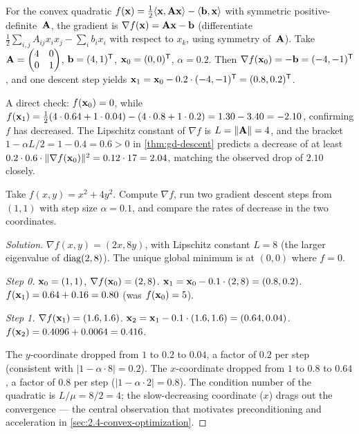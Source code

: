 \begin{example}
\label{ex:gd-step}
For the convex quadratic $f(\mathbf{x}) = \tfrac{1}{2} \langle \mathbf{x}, \mathbf{A} \mathbf{x} \rangle - \langle \mathbf{b}, \mathbf{x} \rangle$
with symmetric positive-definite~$\mathbf{A}$, the gradient is
$\nabla f(\mathbf{x}) = \mathbf{A}\mathbf{x} - \mathbf{b}$ (differentiate
$\tfrac12 \sum_{i,j} A_{ij} x_i x_j - \sum_i b_i x_i$ with respect to
$x_k$, using symmetry of~$\mathbf{A}$). Take
$\mathbf{A} = \begin{pmatrix} 4 & 0 \\ 0 & 1 \end{pmatrix}$,
$\mathbf{b} = (4, 1)^{\mathsf{T}}$, $\mathbf{x}_0 = (0, 0)^{\mathsf{T}}$, $\alpha = 0.2$. Then
$\nabla f(\mathbf{x}_0) = -\mathbf{b} = (-4, -1)^{\mathsf{T}}$, and one descent step
yields $\mathbf{x}_1 = \mathbf{x}_0 - 0.2 \cdot (-4, -1)^{\mathsf{T}} = (0.8, 0.2)^{\mathsf{T}}$.

A direct check: $f(\mathbf{x}_0) = 0$, while
$f(\mathbf{x}_1) = \tfrac{1}{2}(4 \cdot 0.64 + 1 \cdot 0.04) - (4 \cdot 0.8 + 1 \cdot 0.2) = 1.30 - 3.40 = -2.10$,
confirming $f$ has decreased. The Lipschitz constant of $\nabla f$ is
$L = \|\mathbf{A}\| = 4$, and the bracket
$1 - \alpha L / 2 = 1 - 0.4 = 0.6 > 0$ in
\cref{thm:gd-descent} predicts a decrease of at least
$0.2 \cdot 0.6 \cdot \|\nabla f(\mathbf{x}_0)\|^2 = 0.12 \cdot 17 = 2.04$,
matching the observed drop of $2.10$ closely.
\end{example}

\begin{problem}
\label{prob:gd-anisotropic}
Take $f(x, y) = x^2 + 4 y^2$. Compute $\nabla f$, run two gradient
descent steps from $(1, 1)$ with step size $\alpha = 0.1$, and compare
the rates of decrease in the two coordinates.
\end{problem}

\begin{proof}[Solution]
$\nabla f(x, y) = (2x, 8y)$, with Lipschitz constant
$L = 8$ (the larger eigenvalue of $\operatorname{diag}(2, 8)$). The unique global
minimum is at $(0, 0)$ where $f = 0$.

\emph{Step 0.} $\mathbf{x}_0 = (1, 1)$, $\nabla f(\mathbf{x}_0) = (2, 8)$.
$\mathbf{x}_1 = \mathbf{x}_0 - 0.1 \cdot (2, 8) = (0.8, 0.2)$.
$f(\mathbf{x}_1) = 0.64 + 0.16 = 0.80$ (was $f(\mathbf{x}_0) = 5$).

\emph{Step 1.} $\nabla f(\mathbf{x}_1) = (1.6, 1.6)$.
$\mathbf{x}_2 = \mathbf{x}_1 - 0.1 \cdot (1.6, 1.6) = (0.64, 0.04)$.
$f(\mathbf{x}_2) = 0.4096 + 0.0064 = 0.416$.

The $y$-coordinate dropped from $1$ to $0.2$ to $0.04$, a factor of
$0.2$ per step (consistent with $|1 - \alpha \cdot 8| = 0.2$). The
$x$-coordinate dropped from $1$ to $0.8$ to $0.64$, a factor of $0.8$
per step ($|1 - \alpha \cdot 2| = 0.8$). The condition number of the
quadratic is $L/\mu = 8/2 = 4$; the slow-decreasing coordinate
($x$) drags out the convergence — the central observation that
motivates preconditioning and acceleration in
\cref{sec:2.4-convex-optimization}.
\end{proof}
